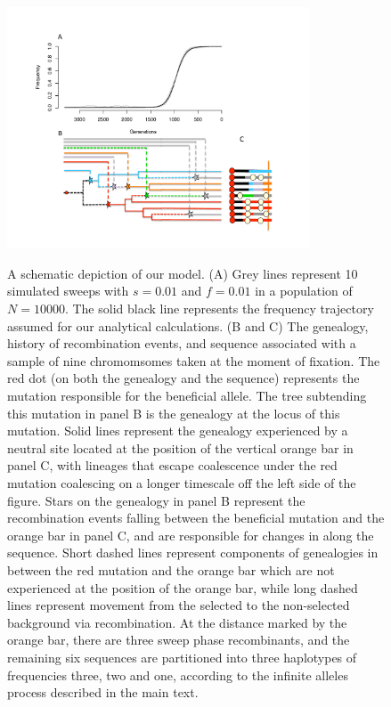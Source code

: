 \documentclass[a4paper,10pt]{article}
\begin{document}
\begin{figure}
	\includegraphics[width = 0.8\textwidth]{../Paper_Figures/SchematicFig1.pdf} \label{cartoon_fig_2}
	\caption{A schematic depiction of our model. (A) Grey lines represent 10 simulated sweeps with $s=0.01$ and $f=0.01$ in a population of $N=10000$. The solid black line represents the frequency trajectory assumed for our analytical calculations. (B and C) The genealogy, history of recombination events, and sequence associated with a sample of nine chromomsomes taken at the moment of fixation. The red dot (on both the genealogy and the sequence) represents the mutation responsible for the beneficial allele. The tree subtending this mutation in panel B is the genealogy at the locus of this mutation. Solid lines represent the genealogy experienced by a neutral site located at the position of the vertical orange bar in panel C, with lineages that escape coalescence under the red mutation coalescing on a longer timescale off the left side of the figure. Stars on the genealogy in panel B represent the recombination events falling between the beneficial mutation and the orange bar in panel C, and are responsible for changes in along the sequence. Short dashed lines represent components of genealogies in between the red mutation and the orange bar which are not experienced at the position of the orange bar, while long dashed lines represent movement from the selected to the non-selected background via recombination. At the distance marked by the orange bar, there are three sweep phase recombinants, and the remaining six sequences are partitioned into three haplotypes of frequencies three, two and one, according to the infinite alleles process described in the main text.}
\end{figure}
\end{document}
